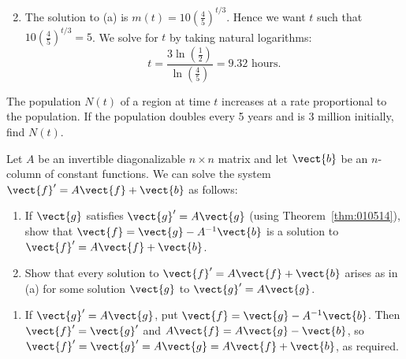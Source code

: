 \begin{multicols}{2}
\begin{ex}
\begin{enumerate}[label={\alph*.}]
\end{enumerate}
\begin{sol}
\begin{enumerate}[label={\alph*.}]
\setcounter{enumi}{1}
\item  The solution to (a) is $m(t) = 10 \left( \frac{4}{5} \right)^{t/3}$.
 Hence we want $t$ such that $10 \left( \frac{4}{5} \right)^{t/3}=5$.
 We solve for $t$ by taking natural logarithms: 
\begin{equation*}
t = \frac{3 \ln (\frac{1}{2})}{\ln (\frac{4}{5})} = 9.32 \mbox{ hours}.
\end{equation*}
\end{enumerate}
\end{sol}
\end{ex}

\begin{ex}
The population $N(t)$ of a region at time $t$ increases at a rate proportional to the population. If the population doubles every 5 years and is 3 million initially, find $N(t)$.
\end{ex}

\begin{ex}
Let $A$ be an invertible diagonalizable $n \times n$ matrix and let $\vect{b}$ be an $n$-column of constant functions. We can solve the system $\vect{f}^{\prime} = A\vect{f} + \vect{b}$ as follows:


\begin{enumerate}[label={\alph*.}]
\item If $\vect{g}$ satisfies $\vect{g}^{\prime} = A\vect{g}$ (using Theorem~\ref{thm:010514}), show that $\vect{f} = \vect{g} - A^{-1}\vect{b}$ is a solution to $\vect{f}^{\prime} = A\vect{f} + \vect{b}$.

\item Show that every solution to $\vect{f}^{\prime} = A\vect{f} + \vect{b}$ arises as in (a) for some solution $\vect{g}$ to $\vect{g}^{\prime} = A\vect{g}$.

\end{enumerate}
\begin{sol}
\begin{enumerate}[label={\alph*.}]
\item  If $\vect{g}^{\prime} = A\vect{g}$, put $\vect{f} = \vect{g} - A^{-1}\vect{b}$. Then $\vect{f}^{\prime} = \vect{g}^{\prime}$ and $A\vect{f} = A\vect{g} - \vect{b}$, so $\vect{f}^{\prime} = \vect{g}^{\prime} = A\vect{g} = A\vect{f} + \vect{b}$, as required.

\end{enumerate}
\end{sol}
\end{ex}


\end{multicols}

